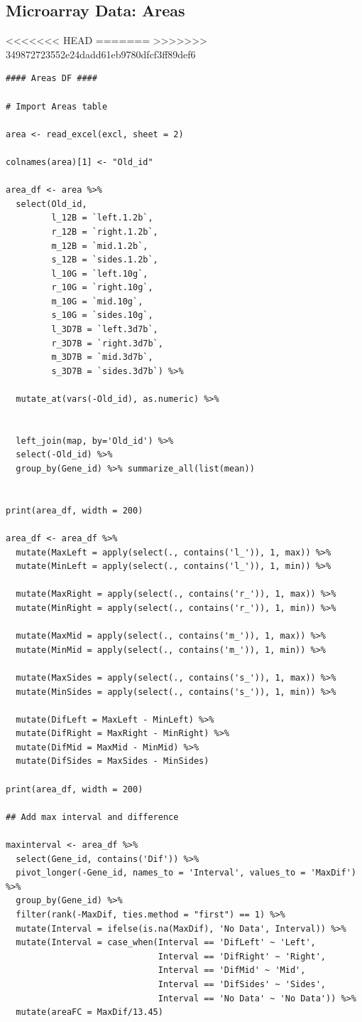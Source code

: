 \documentclass[11pt]{article}
\begin{document}
\subsection{Microarray Data: Areas}
<<<<<<< HEAD
\label{sec:orgbf2fbbd}
=======
\label{sec:orgf685e88}
>>>>>>> 349872723552e24dadd61eb9780dfcf3ff89def6
\begin{verbatim}
#### Areas DF ####

# Import Areas table

area <- read_excel(excl, sheet = 2)

colnames(area)[1] <- "Old_id"

area_df <- area %>%
  select(Old_id,
         l_12B = `left.1.2b`,
         r_12B = `right.1.2b`,
         m_12B = `mid.1.2b`,
         s_12B = `sides.1.2b`,
         l_10G = `left.10g`,
         r_10G = `right.10g`,
         m_10G = `mid.10g`,
         s_10G = `sides.10g`,
         l_3D7B = `left.3d7b`,
         r_3D7B = `right.3d7b`,
         m_3D7B = `mid.3d7b`,
         s_3D7B = `sides.3d7b`) %>%

  mutate_at(vars(-Old_id), as.numeric) %>%


  left_join(map, by='Old_id') %>%
  select(-Old_id) %>%
  group_by(Gene_id) %>% summarize_all(list(mean))


print(area_df, width = 200)

area_df <- area_df %>%
  mutate(MaxLeft = apply(select(., contains('l_')), 1, max)) %>%
  mutate(MinLeft = apply(select(., contains('l_')), 1, min)) %>%

  mutate(MaxRight = apply(select(., contains('r_')), 1, max)) %>%
  mutate(MinRight = apply(select(., contains('r_')), 1, min)) %>%

  mutate(MaxMid = apply(select(., contains('m_')), 1, max)) %>%
  mutate(MinMid = apply(select(., contains('m_')), 1, min)) %>%

  mutate(MaxSides = apply(select(., contains('s_')), 1, max)) %>%
  mutate(MinSides = apply(select(., contains('s_')), 1, min)) %>%

  mutate(DifLeft = MaxLeft - MinLeft) %>%
  mutate(DifRight = MaxRight - MinRight) %>%
  mutate(DifMid = MaxMid - MinMid) %>%
  mutate(DifSides = MaxSides - MinSides)

print(area_df, width = 200)

## Add max interval and difference

maxinterval <- area_df %>%
  select(Gene_id, contains('Dif')) %>%
  pivot_longer(-Gene_id, names_to = 'Interval', values_to = 'MaxDif') %>%
  group_by(Gene_id) %>%
  filter(rank(-MaxDif, ties.method = "first") == 1) %>%
  mutate(Interval = ifelse(is.na(MaxDif), 'No Data', Interval)) %>%
  mutate(Interval = case_when(Interval == 'DifLeft' ~ 'Left',
                              Interval == 'DifRight' ~ 'Right',
                              Interval == 'DifMid' ~ 'Mid',
                              Interval == 'DifSides' ~ 'Sides',
                              Interval == 'No Data' ~ 'No Data')) %>%
  mutate(areaFC = MaxDif/13.45)


\end{verbatim}
\end{document}
